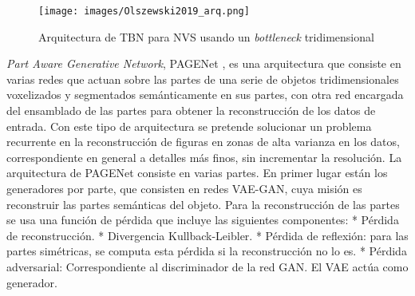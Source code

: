 \documentclass[12pt, spanish]{article}
\begin{document}
\begin{figure}[h]
\texttt{[image: images/Olszewski2019\_arq.png]}
\centering
\caption{Arquitectura de TBN \cite{Wu2016} para NVS usando un \textit{bottleneck} tridimensional}
\label{TBN_arq}
\end{figure}


\textit{Part Aware Generative Network}, PAGENet \cite{Li2019}, es una
arquitectura que consiste en varias redes que actuan sobre las partes
de una serie de objetos tridimensionales voxelizados y segmentados
semánticamente en sus partes, con otra red encargada del ensamblado
de las partes para obtener la reconstrucción de los datos de entrada.
Con este tipo de arquitectura se pretende solucionar un problema
recurrente en la reconstrucción de figuras en zonas de alta varianza
en los datos, correspondiente en general a detalles más finos, sin
incrementar la resolución.
La arquitectura de PAGENet consiste en varias partes. En primer lugar
están los generadores por parte, que consisten en redes VAE-GAN, cuya
misión es reconstruir las partes semánticas del objeto.
Para la reconstrucción de las partes se usa una función de pérdida que
incluye las siguientes componentes:
* Pérdida de reconstrucción.
* Divergencia Kullback-Leibler.
* Pérdida de reflexión: para las partes simétricas, se computa esta
pérdida si la reconstrucción no lo es.
* Pérdida adversarial: Correspondiente al discriminador de la red GAN.
El VAE actúa como generador.
\end{document}
